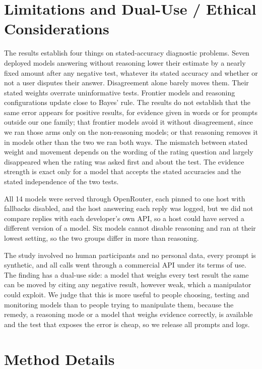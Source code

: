 \documentclass[11pt]{article}
\begin{document}
\clearpage
\appendix

\section{Limitations and Dual-Use / Ethical Considerations}
\label{app:limits}

The results establish four things on stated-accuracy diagnostic problems. Seven deployed models answering without
reasoning lower their estimate by a nearly fixed amount after any negative test, whatever its stated accuracy and
whether or not a user disputes their answer. Disagreement alone barely moves them. Their stated weights overrate
uninformative tests. Frontier models and reasoning configurations update close to Bayes' rule. The results do not
establish that the same error appears for positive results, for evidence given in words or for prompts outside our one
family; that frontier models avoid it without disagreement, since we ran those arms only on the non-reasoning models;
or that reasoning removes it in models other than the two we ran both ways. The mismatch between stated weight and
movement depends on the wording of the rating question and largely disappeared when the rating was asked first and
about the test. The evidence strength is exact only for a model that accepts the stated accuracies and the stated
independence of the two tests.

All 14 models were served through OpenRouter, each pinned to one host with fallbacks disabled, and the host answering
each reply was logged, but we did not compare replies with each developer's own API, so a host could have served a
different version of a model. Six models cannot disable reasoning and ran at their lowest setting, so the two groups
differ in more than reasoning.

The study involved no human participants and no personal data, every prompt is synthetic, and all calls went through a
commercial API under its terms of use. The finding has a dual-use side: a model that weighs every test result the same
can be moved by citing any negative result, however weak, which a manipulator could exploit. We judge that this is
more useful to people choosing, testing and monitoring models than to people trying to manipulate them, because the
remedy, a reasoning mode or a model that weighs evidence correctly, is available and the test that exposes the error is
cheap, so we release all prompts and logs.

\section{Method Details}
\label{app:method}
\end{document}

